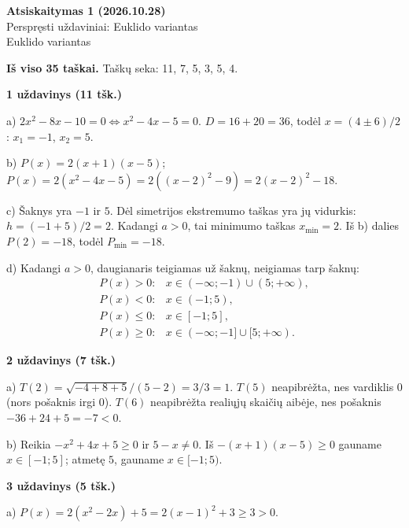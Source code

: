 \documentclass[11pt]{article}
\newcommand{\antraste}[1]{\begin{center}\Large\textbf{Atsiskaitymas 1 (2026.10.28)}\\\large #1\\\normalsize Euklido variantas\end{center}}
\newcommand{\sk}[1]{\par\medskip\textbf{#1}\par}
\begin{document}
\antraste{Perspręsti uždaviniai: Euklido variantas}
\textbf{Iš viso 35 taškai.} Taškų seka: 11, 7, 5, 3, 5, 4.
\sk{1 uždavinys (11 tšk.)}
a) $2x^2-8x-10=0\iff x^2-4x-5=0$. $D=16+20=36$, todėl
$x=(4\pm6)/2$: $x_1=-1$, $x_2=5$.

b) $P(x)=2(x+1)(x-5)$;
$P(x)=2(x^2-4x-5)=2((x-2)^2-9)=2(x-2)^2-18$.

c) Šaknys yra $-1$ ir $5$. Dėl simetrijos ekstremumo taškas yra jų vidurkis: $h=(-1+5)/2=2$. Kadangi $a>0$, tai minimumo taškas $x_{\min}=2$. Iš b) dalies $P(2)=-18$, todėl $P_{\min}=-18$.

d) Kadangi $a>0$, daugianaris teigiamas už šaknų, neigiamas tarp šaknų:
\[
\begin{array}{ll}
P(x)>0:&x\in(-\infty;-1)\cup(5;+\infty),\\
P(x)<0:&x\in(-1;5),\\
P(x)\le0:&x\in[-1;5],\\
P(x)\ge0:&x\in(-\infty;-1]\cup[5;+\infty).
\end{array}
\]
\sk{2 uždavinys (7 tšk.)}
a) $T(2)=\sqrt{-4+8+5}/(5-2)=3/3=1$.
$T(5)$ neapibrėžta, nes vardiklis $0$ (nors pošaknis irgi $0$).
$T(6)$ neapibrėžta realiųjų skaičių aibėje, nes pošaknis $-36+24+5=-7<0$.

b) Reikia $-x^2+4x+5\ge0$ ir $5-x\ne0$.
Iš $-(x+1)(x-5)\ge0$ gauname $x\in[-1;5]$; atmetę $5$, gauname
$\boxed{x\in[-1;5)}$.
\sk{3 uždavinys (5 tšk.)}
a) $P(x)=2(x^2-2x)+5=2(x-1)^2+3\ge3>0$.
\end{document}

